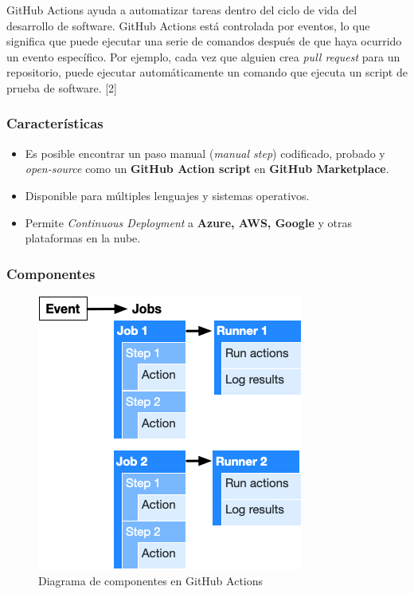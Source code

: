 \documentclass[twoside,twocolumn]{article}
\begin{document}
GitHub Actions ayuda a automatizar tareas dentro del ciclo de vida del desarrollo de software. GitHub Actions está controlada por eventos, lo que significa que puede ejecutar una serie de comandos después de que haya ocurrido un evento específico. Por ejemplo, cada vez que alguien crea \textit{pull request} para un repositorio, puede ejecutar automáticamente un comando que ejecuta un script de prueba de software. [2]

\subsubsection{Características}

\begin{itemize}
    \item Es posible encontrar un paso manual (\textit{manual step}) codificado, probado y \textit{open-source} como un \textbf{GitHub Action script} en \textbf{GitHub Marketplace}.
    \item Disponible para múltiples lenguajes y sistemas operativos.
    \item Permite \textit{Continuous Deployment} a \textbf{Azure, AWS, Google} y otras plataformas en la nube.
\end{itemize}

\subsubsection{Componentes}

\begin{figure}[h]
    \includegraphics[width = \columnwidth]{./Imagenes/overview-actions-design.png}
    \caption{Diagrama de componentes en GitHub Actions}
\end{figure}
\end{document}

